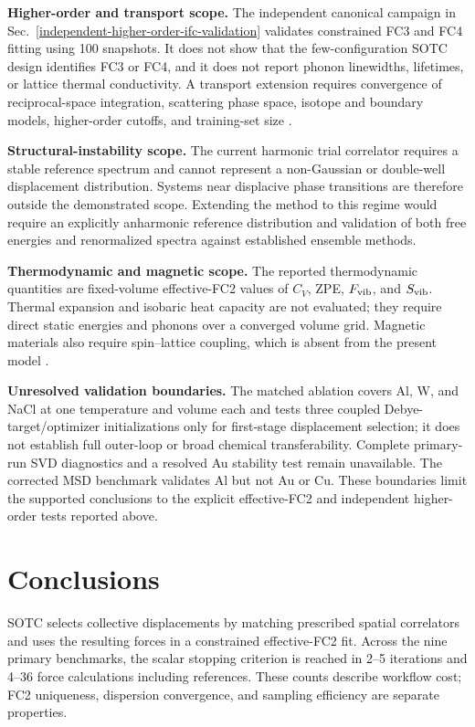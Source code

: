 \documentclass[aps,prb,reprint,amsmath,amssymb,floatfix]{revtex4-2}
\begin{document}
\textbf{Higher-order and transport scope.} The independent canonical campaign
in Sec.~\ref{independent-higher-order-ifc-validation} validates constrained FC3
and FC4 fitting using 100 snapshots. It does not show that the
few-configuration SOTC design identifies FC3 or FC4, and it does not report
phonon linewidths, lifetimes, or lattice thermal conductivity. A transport
extension requires convergence of reciprocal-space integration, scattering
phase space, isotope and boundary models, higher-order cutoffs, and training-set
size \cite{ref40}.

\textbf{Structural-instability scope.} The current harmonic trial correlator
requires a stable reference spectrum and cannot represent a non-Gaussian or
double-well displacement distribution. Systems near displacive phase
transitions are therefore outside the demonstrated scope. Extending the method
to this regime would require an explicitly anharmonic reference distribution
and validation of both free energies and renormalized spectra against
established ensemble methods.

\textbf{Thermodynamic and magnetic scope.} The reported thermodynamic quantities
are fixed-volume effective-FC2 values of \(C_V\), ZPE, \(F_{\rm vib}\), and
\(S_{\rm vib}\). Thermal expansion and isobaric heat capacity are not evaluated;
they require direct static energies and phonons over a converged volume grid.
Magnetic materials also require spin--lattice coupling, which is absent from the
present model \cite{ref41}.

\textbf{Unresolved validation boundaries.} The matched ablation covers Al, W,
and NaCl at one temperature and volume each and tests three coupled
Debye-target/optimizer initializations only for first-stage displacement
selection; it does not establish full outer-loop or broad chemical
transferability. Complete primary-run SVD diagnostics and a resolved Au
stability test remain unavailable. The corrected MSD benchmark validates Al
but not Au or Cu. These boundaries limit the supported conclusions to the
explicit effective-FC2 and independent higher-order tests reported above.

\section{Conclusions}\label{conclusions}

SOTC selects collective displacements by matching prescribed spatial
correlators and uses the resulting forces in a constrained effective-FC2 fit.
Across the nine primary benchmarks, the scalar stopping criterion is reached in
2--5 iterations and 4--36 force calculations including references. These
counts describe workflow cost; FC2 uniqueness, dispersion convergence, and
sampling efficiency are separate properties.
\end{document}
